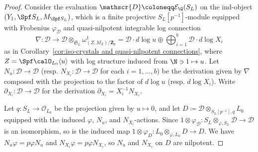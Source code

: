 \begin{proof}
Consider the evaluation $\mathscr{D} \coloneqq \mathcal{E}_\Q(S_L)$ on the ind-object $(Y_1,\Spf S_L,M_{\Spf S_L})$, which is a finite projective $S_L[p^{-1}]$-module equipped with Frobenius $\varphi_{\mathscr{D}}$ and quasi-nilpotent integrable log connection 
\[
\nabla\colon \mathscr{D} \rightarrow \mathscr{D}\otimes_{\mathfrak{S}_L} \omega^1_{(Z,M_Z) / \mathbf{Z}_p} = \mathscr{D}\cdot d\operatorname{log} u \oplus \bigoplus_{i=1}^b \mathscr{D}\cdot d\operatorname{log} X_i
\]
as in Corollary~\ref{cor:iso-crystals and quasi-nilpotent connections}, where $Z=\Spf \calO_{L_0}\langle u\rangle$ with log structure induced from $\N\ni 1\mapsto u$. Let $N_u\colon \mathscr{D} \rightarrow \mathscr{D}$ (resp. $N_{X_i}\colon \mathscr{D} \rightarrow \mathscr{D}$ for each $i = 1, \ldots, b$) be the derivation given by $\nabla$ composed with the projection to the factor of $d\operatorname{log} u$ (resp. $d\operatorname{log} X_i$). Write $\partial_{X_i}\colon \mathscr{D} \rightarrow \mathscr{D}$ for the derivation $\partial_{X_i} = X_i^{-1}N_{X_i}$.

Let $q\colon S_L \rightarrow \mathcal{O}_{L_0}$ be the projection given by $u \mapsto 0$, and let $D\coloneqq \mathscr{D}\otimes_{S_L[p^{-1}], q} L_0$ equipped with the induced $\varphi$, $N_u$, and $N_{X_i}$-actions. Since $1\otimes\varphi_{\mathscr{D}} \colon S_L\otimes_{\varphi, S_L} \mathscr{D} \rightarrow \mathscr{D}$ is an isomorphism, so is the induced map $1\otimes\varphi_D \colon L_0\otimes_{\varphi, L_0} D \rightarrow D$. We have $N_u\varphi = p\varphi N_u$ and $N_{X_i}\varphi = p\varphi N_{X_i}$, so $N_u$ and $N_{X_i}$ on $D$ are nilpotent. 


\end{proof}
